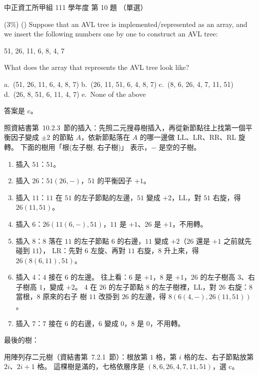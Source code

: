 \begin{pastexam}[label={px:ccu-111-swa-02}]{中正資工所甲組 111 學年度 第 10 題}
（單選）

(3\%) (\quad) Suppose that an AVL tree is implemented/represented as an array, and we insert
the following numbers one by one to construct an AVL tree:
\begin{center}51, 26, 11, 6, 8, 4, 7\end{center}
What does the array that represents the AVL tree look like?

a.~(51, 26, 11, 6, 4, 8, 7) \qquad b.~(26, 11, 51, 6, 4, 8, 7) \qquad c.~(8, 6, 26, 4, 7, 11, 51)\\
d.~(26, 8, 51, 6, 11, 4, 7) \qquad e.~None of the above
\end{pastexam}

\begin{pastsoln}
答案是 c。

照資結書第~10.2.3~節的插入：先照二元搜尋樹插入，再從新節點往上找第一個平衡因子變成 $\pm 2$
的節點 $A$，依新節點落在 $A$ 的哪一邊做 LL、LR、RR、RL 旋轉。 下面的樹用「根(左子樹, 右子樹)」
表示，$-$ 是空的子樹。
\begin{enumerate}
\item 插入 $51$：$51$。
\item 插入 $26$：$51(26, -)$，$51$ 的平衡因子 $+1$。
\item 插入 $11$：$11$ 在 $51$ 的左子節點的左邊，$51$ 變成 $+2$，LL，對 $51$ 右旋，得
$26(11, 51)$。
\item 插入 $6$：$26(11(6, -), 51)$，$11$ 是 $+1$、$26$ 是 $+1$，不用轉。
\item 插入 $8$：$8$ 落在 $11$ 的左子節點 $6$ 的右邊，$11$ 變成 $+2$（$26$ 還是 $+1$ 之前就先碰到 $11$），
LR：先對 $6$ 左旋、再對 $11$ 右旋，$8$ 升上來，得 $26(8(6, 11), 51)$。
\item 插入 $4$：$4$ 接在 $6$ 的左邊。 往上看：$6$ 是 $+1$，$8$ 是 $+1$，$26$ 的左子樹高 $3$、右子樹高
$1$，變成 $+2$。 $4$ 在 $26$ 的左子節點 $8$ 的左子樹裡，LL，對 $26$ 右旋：$8$ 當根，$8$ 原來的右子
樹 $11$ 改掛到 $26$ 的左邊，得 $8(6(4, -), 26(11, 51))$。
\item 插入 $7$：$7$ 接在 $6$ 的右邊，$6$ 變成 $0$，$8$ 是 $0$，不用轉。
\end{enumerate}
最後的樹：
\begin{center}
\end{center}
用陣列存二元樹（資結書第~7.2.1~節）：根放第 $1$ 格，第 $i$ 格的左、右子節點放第 $2i$、$2i + 1$
格。 這棵樹是滿的，七格依層序是 $(8, 6, 26, 4, 7, 11, 51)$，選 c。


\end{pastsoln}

